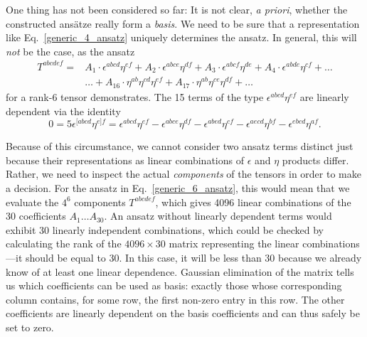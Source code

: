 One thing has not been considered so far: It is not clear, \emph{a priori}, whether the constructed ansätze really form a \emph{basis}. We need to be sure that a representation like Eq.\ \eqref{generic_4_ansatz} uniquely determines the ansatz. In general, this will \emph{not} be the case, as the ansatz
\begin{equation}\label{generic_6_ansatz}
  \begin{aligned}
    T^{abcdef} = {} & A_1 \cdot \epsilon^{abcd} \eta^{ef} + A_2 \cdot \epsilon^{abce} \eta^{df} + A_3 \cdot \epsilon^{abcf} \eta^{de} + A_4 \cdot \epsilon^{abde} \eta^{cf} + \dots \\
    {} & \dots + A_{16} \cdot \eta^{ab} \eta^{cd} \eta^{ef} + A_{17} \cdot \eta^{ab} \eta^{ce} \eta^{df} + \dots
  \end{aligned}
\end{equation}
for a rank-6 tensor demonstrates. The 15 terms of the type $\epsilon^{abcd}\eta^{ef}$ are linearly dependent via the identity
\begin{equation}
  0 = 5 \epsilon^{\lbrack abcd}\eta^{e\rbrack f} = \epsilon^{abcd} \eta^{ef} - \epsilon^{abce} \eta^{df} - \epsilon^{abed} \eta^{cf} - \epsilon^{aecd} \eta^{bf} - \epsilon^{ebcd} \eta^{af}.
\end{equation}

Because of this circumstance, we cannot consider two ansatz terms distinct just because their representations as linear combinations of $\epsilon$ and $\eta$ products differ. Rather, we need to inspect the actual \emph{components} of the tensors in order to make a decision. For the ansatz in Eq.\ \eqref{generic_6_ansatz}, this would mean that we evaluate the $4^6$ components $T^{abcdef}$, which gives 4096 linear combinations of the 30 coefficients $A_1\dots A_{30}$. An ansatz without linearly dependent terms would exhibit 30 linearly independent combinations, which could be checked by calculating the rank of the $4096\times 30$ matrix representing the linear combinations---it should be equal to 30. In this case, it will be less than 30 because we already know of at least one linear dependence. Gaussian elimination of the matrix tells us which coefficients can be used as basis: exactly those whose corresponding column contains, for some row, the first non-zero entry in this row. The other coefficients are linearly dependent on the basis coefficients and can thus safely be set to zero.

